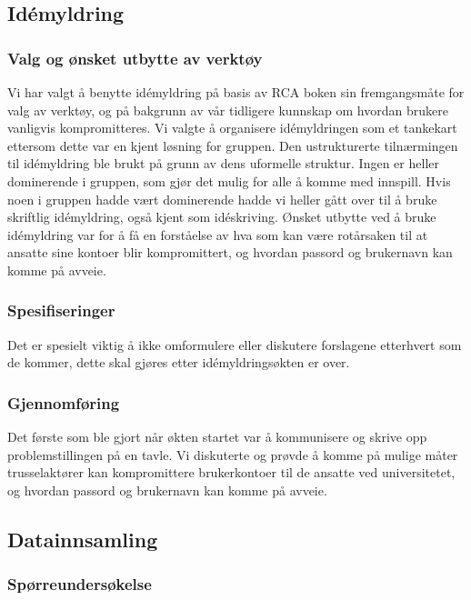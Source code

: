 \subsection{Idémyldring}

\subsubsection{Valg og ønsket utbytte av verktøy}
Vi har valgt å benytte idémyldring på basis av RCA boken \cite{RCA} sin fremgangsmåte for valg av verktøy, og på bakgrunn av vår tidligere kunnskap om hvordan brukere vanligvis kompromitteres. Vi valgte å organisere idémyldringen som et tankekart ettersom dette var en kjent løsning for gruppen. Den ustrukturerte tilnærmingen til idémyldring ble brukt på grunn av dens uformelle struktur. Ingen er heller dominerende i gruppen, som gjør det mulig for alle å komme med innspill. Hvis noen i gruppen hadde vært dominerende hadde vi heller gått over til å bruke skriftlig idémyldring, også kjent som idéskriving. Ønsket utbytte ved å bruke idémyldring var for å få en forståelse av hva som kan være rotårsaken til at ansatte sine kontoer blir kompromittert, og hvordan passord og brukernavn kan komme på avveie. 

\subsubsection{Spesifiseringer}
Det er spesielt viktig å ikke omformulere eller diskutere forslagene etterhvert som de kommer, dette skal gjøres etter idémyldringsøkten er over.

\subsubsection{Gjennomføring}
Det første som ble gjort når økten startet var å kommunisere og skrive opp problemstillingen på en tavle. Vi diskuterte og prøvde å komme på mulige måter trusselaktører kan kompromittere brukerkontoer til de ansatte ved universitetet, og hvordan passord og brukernavn kan komme på avveie.


\subsection{Datainnsamling}

\subsubsection{Spørreundersøkelse}

